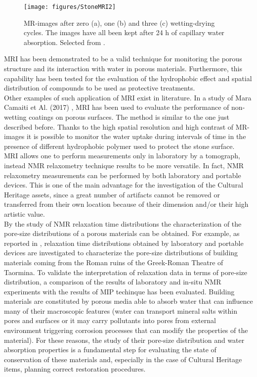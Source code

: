 \documentclass[a4paper,11pt]{report}
\begin{document}
\begin{figure}[h] 
\centering
\texttt{[image: figures/StoneMRI2]}	
\caption{MR-images after zero (a), one (b) and three (c) wetting-drying cycles. The images have all been kept after 24 h of capillary water absorption. Selected from \cite{trestone}.}
\label{MRI:2}
\end{figure}


MRI has been demonstrated to be a valid technique for monitoring the porous structure and its interaction with  water  in porous materials. Furthermore, this capability has been tested for the evaluation of the hydrophobic effect and spatial distribution of compounds to be used as protective treatments. \\
Other examples of such application of MRI exist in literature. In a study of Mara Camaiti et Al. (2017) \cite{quattrostone}, MRI has been used to evaluate the performance of non-wetting coatings on porous surfaces. The method is similar to the one just described before. Thanks to the high spatial resolution and high contrast of MR-images it is possible to monitor the water uptake during intervals of time in the presence of different hydrophobic polymer used to protect the stone surface. \\
MRI allows one to perform measurements only in laboratory by a tomograph, instead NMR relaxometry technique results to be more versatile. In fact, NMR relaxometry measurements can be performed  by both laboratory  and portable devices. This is one of the main advantage for the investigation of the Cultural Heritage assets, since a great number of artifacts cannot be removed or transferred from their own location because of their dimension and/or their high artistic value.\\
By the study of NMR relaxation time distributions the characterization of the pore-size distributions of a porous materials can be obtained. For example, as reported in \cite{due}, relaxation time distributions obtained by laboratory and portable devices are investigated to characterize the pore-size distributions of building materials coming from the Roman ruins of the Greek-Roman Theatre of Taormina. To validate the interpretation of relaxation data in terms of pore-size distribution, a comparison of the results of laboratory and in-situ NMR experiments with the results of MIP techinque has been evaluated. Building materials are constituted by porous media able to absorb water that can influence many of their macroscopic features (water can transport mineral salts within pores and surfaces or it may carry pollutants into pores from external environment triggering corrosion processes that can modify the properties of the material). For these reasons, the study of their pore-size distribution and water absorption properties is a fundamental step for evaluating the state of conservation of these materials and, especially in the case of Cultural Heritage items, planning correct restoration procedures.\\
\end{document}
